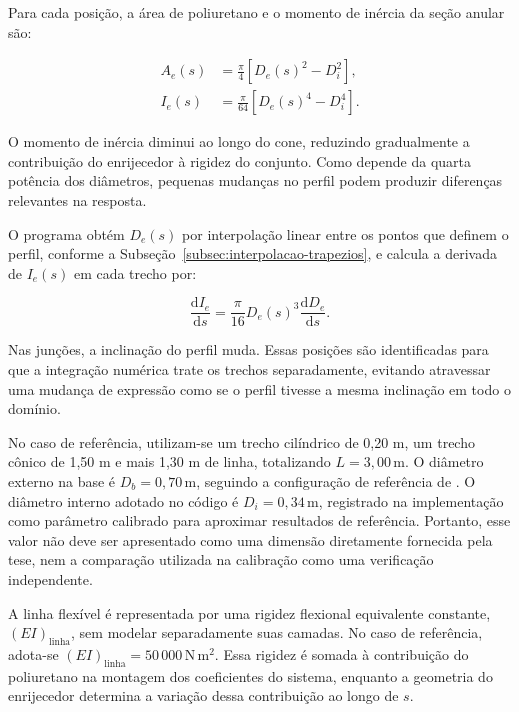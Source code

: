 \documentclass[arial,centeredequations,english,brazilian,oneside,section=TITLE]{ifes8}
\begin{document}
Para cada posição, a área de poliuretano e o momento de inércia da seção anular são:

\begin{align}
  A_e(s)&=\frac{\pi}{4}\left[D_e(s)^2-D_i^2\right],
    \label{eq:area-enrijecedor-metodologia}\\
  I_e(s)&=\frac{\pi}{64}\left[D_e(s)^4-D_i^4\right].
    \label{eq:inercia-enrijecedor-metodologia}
\end{align}

O momento de inércia diminui ao longo do cone, reduzindo gradualmente a contribuição do
enrijecedor à rigidez do conjunto. Como depende da quarta potência dos diâmetros, pequenas
mudanças no perfil podem produzir diferenças relevantes na resposta.

O programa obtém $D_e(s)$ por interpolação linear entre os pontos que definem o perfil,
conforme a Subseção~\ref{subsec:interpolacao-trapezios},
e calcula a derivada de $I_e(s)$ em cada trecho por:

\begin{equation}
  \label{eq:derivada-inercia-metodologia}
  \frac{\mathrm{d}I_e}{\mathrm{d}s}
  =\frac{\pi}{16}D_e(s)^3\frac{\mathrm{d}D_e}{\mathrm{d}s}.
\end{equation}

Nas junções, a inclinação do perfil muda. Essas posições são identificadas para que a
integração numérica trate os trechos separadamente, evitando atravessar uma mudança de
expressão como se o perfil tivesse a mesma inclinação em todo o domínio.

No caso de referência, utilizam-se um trecho cilíndrico de 0,20 m, um trecho cônico de
1,50 m e mais 1,30 m de linha, totalizando $L=3{,}00\,\mathrm{m}$. O diâmetro externo
na base é $D_b=0{,}70\,\mathrm{m}$, seguindo a configuração de referência de
. O diâmetro interno adotado no código é $D_i=0{,}34\,\mathrm{m}$,
registrado na implementação como parâmetro calibrado para aproximar resultados de
referência. Portanto, esse valor não deve ser apresentado como uma dimensão diretamente
fornecida pela tese, nem a comparação utilizada na calibração como uma verificação
independente.

A linha flexível é representada por uma rigidez flexional equivalente constante,
$(EI)_{\mathrm{linha}}$, sem modelar separadamente suas camadas. No caso de referência,
adota-se $(EI)_{\mathrm{linha}}=50\,000\,\mathrm{N\,m^2}$. Essa rigidez é somada à
contribuição do poliuretano na montagem dos coeficientes do sistema, enquanto a geometria
do enrijecedor determina a variação dessa contribuição ao longo de $s$.
\end{document}
